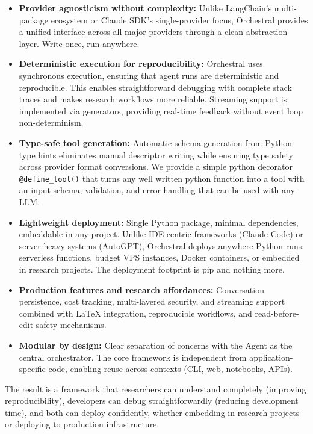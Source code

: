 \documentclass{article}
\begin{document}
\begin{itemize}
    \item \textbf{Provider agnosticism without complexity:} Unlike LangChain's multi-package ecosystem or Claude SDK's single-provider focus, Orchestral provides a unified interface across all major providers through a clean abstraction layer. Write once, run anywhere.

    \item \textbf{Deterministic execution for reproducibility:} Orchestral uses synchronous execution, ensuring that agent runs are deterministic and reproducible. This enables straightforward debugging with complete stack traces and makes research workflows more reliable. Streaming support is implemented via generators, providing real-time feedback without event loop non-determinism.

    \item \textbf{Type-safe tool generation:} Automatic schema generation from Python type hints eliminates manual descriptor writing while ensuring type safety across provider format conversions. We provide a simple python decorator \texttt{@define\_tool()} that turns any well written python function into a tool with an input schema, validation, and error handling that can be used with any LLM.

    \item \textbf{Lightweight deployment:} Single Python package, minimal dependencies, embeddable in any project. Unlike IDE-centric frameworks (Claude Code) or server-heavy systems (AutoGPT), Orchestral deploys anywhere Python runs: serverless functions, budget VPS instances, Docker containers, or embedded in research projects. The deployment footprint is pip and nothing more.

    \item \textbf{Production features and research affordances:} Conversation persistence, cost tracking, multi-layered security, and streaming support combined with LaTeX integration, reproducible workflows, and read-before-edit safety mechanisms.

    \item \textbf{Modular by design:} Clear separation of concerns with the Agent as the central orchestrator. The core framework is independent from application-specific code, enabling reuse across contexts (CLI, web, notebooks, APIs).
\end{itemize}

The result is a framework that researchers can understand completely (improving reproducibility), developers can debug straightforwardly (reducing development time), and both can deploy confidently, whether embedding in research projects or deploying to production infrastructure.
\end{document}
